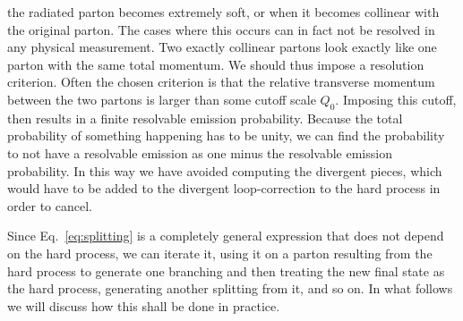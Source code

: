 the radiated parton becomes extremely soft, or when it becomes collinear with the original parton. 
The cases where this occurs can in fact not be resolved in any physical measurement. Two exactly
collinear partons look exactly like one parton with the same total momentum. We should thus impose
a resolution criterion. Often the chosen criterion is that the relative transverse momentum
between the two partons is larger than some cutoff scale $Q_0$. Imposing this cutoff, then results
in a finite resolvable emission probability. Because the total probability of something happening
has to be unity, we can find the probability to not have a resolvable emission as one minus the
resolvable emission probability. In this way we have avoided computing the divergent pieces, which
would have to be added to the divergent loop-correction to the hard process in order to cancel.

Since Eq.~\ref{eq:splitting} is a completely general expression that does not depend on the hard
process, we can iterate it, using it on a parton resulting from the hard process to generate
one branching and then treating the new final state as the hard process, generating another
splitting from it, and so on. In what follows we will discuss how this shall be done in practice.

